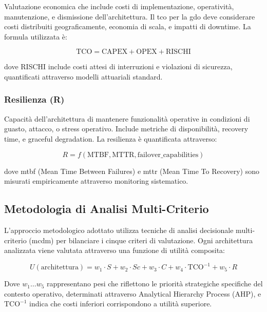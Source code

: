 Valutazione economica che include costi di implementazione, operatività, manutenzione, e dismissione dell'architettura. Il \gls{tco} per la \gls{gdo} deve considerare costi distribuiti geograficamente, economia di scala, e impatti di downtime. La formula utilizzata è:

\begin{equation}
\text{TCO} = \text{CAPEX} + \text{OPEX} + \text{RISCHI}
\label{eq:tco}
\end{equation}

dove RISCHI include costi attesi di interruzioni e violazioni di sicurezza, quantificati attraverso modelli attuariali standard.

\subsubsection{Resilienza (R)}

Capacità dell'architettura di mantenere funzionalità operative in condizioni di guasto, attacco, o stress operativo. Include metriche di disponibilità, recovery time, e graceful degradation. La resilienza è quantificata attraverso:

\begin{equation}
R = f(\text{MTBF}, \text{MTTR}, \text{failover\_capabilities})
\label{eq:resilienza}
\end{equation}

dove \gls{mtbf} (Mean Time Between Failures) e \gls{mttr} (Mean Time To Recovery) sono misurati empiricamente attraverso monitoring sistematico.

\subsection{Metodologia di Analisi Multi-Criterio}
\label{subsec:metodologia-mcdm}

L'approccio metodologico adottato utilizza tecniche di analisi decisionale multi-criterio (\gls{mcdm}) per bilanciare i cinque criteri di valutazione. Ogni architettura analizzata viene valutata attraverso una funzione di utilità composita:

\begin{equation}
U(\text{architettura}) = w_1 \cdot S + w_2 \cdot Sc + w_3 \cdot C + w_4 \cdot \text{TCO}^{-1} + w_5 \cdot R
\label{eq:utilita-composita}
\end{equation}

Dove $w_1 \ldots w_5$ rappresentano pesi che riflettono le priorità strategiche specifiche del contesto operativo, determinati attraverso Analytical Hierarchy Process (AHP), e $\text{TCO}^{-1}$ indica che costi inferiori corrispondono a utilità superiore.

